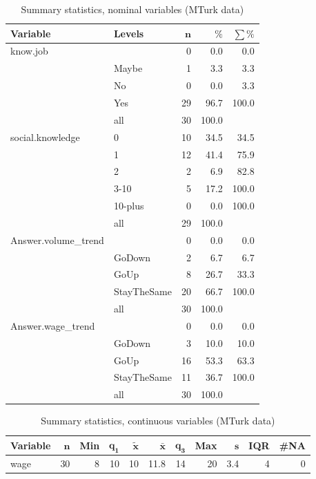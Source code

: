 \documentclass[a4paper,10pt]{article}\usepackage[]{graphicx}\usepackage[]{color}
\begin{document}
\begin{table}[ht]
\centering
{\footnotesize
\begin{tabular}{ll|rrr}
 \textbf{Variable} & \textbf{Levels} & $\mathbf{n}$ & $\mathbf{\%}$ & $\mathbf{\sum \%}$ \\ 
  \hline
know.job &  & 0 & 0.0 & 0.0 \\ 
   & Maybe & 1 & 3.3 & 3.3 \\ 
   & No & 0 & 0.0 & 3.3 \\ 
   & Yes & 29 & 96.7 & 100.0 \\ 
   \hline
 & all & 30 & 100.0 &  \\ 
   \hline
\hline
social.knowledge & 0 & 10 & 34.5 & 34.5 \\ 
   & 1 & 12 & 41.4 & 75.9 \\ 
   & 2 & 2 & 6.9 & 82.8 \\ 
   & 3-10 & 5 & 17.2 & 100.0 \\ 
   & 10-plus & 0 & 0.0 & 100.0 \\ 
   \hline
 & all & 29 & 100.0 &  \\ 
   \hline
\hline
Answer.volume\_trend &  & 0 & 0.0 & 0.0 \\ 
   & GoDown & 2 & 6.7 & 6.7 \\ 
   & GoUp & 8 & 26.7 & 33.3 \\ 
   & StayTheSame & 20 & 66.7 & 100.0 \\ 
   \hline
 & all & 30 & 100.0 &  \\ 
   \hline
\hline
Answer.wage\_trend &  & 0 & 0.0 & 0.0 \\ 
   & GoDown & 3 & 10.0 & 10.0 \\ 
   & GoUp & 16 & 53.3 & 63.3 \\ 
   & StayTheSame & 11 & 36.7 & 100.0 \\ 
   \hline
 & all & 30 & 100.0 &  \\ 
   \hline
\hline
\end{tabular}
}
\caption{Summary statistics, nominal variables (MTurk data)} 
\label{tab1:37-3010}
\end{table}
\begin{table}[ht]
\centering
{\footnotesize
\begin{tabular}{lrrrrrrrrrr}
 \textbf{Variable} & $\mathbf{n}$ & \textbf{Min} & $\mathbf{q_1}$ & $\mathbf{\widetilde{x}}$ & $\mathbf{\bar{x}}$ & $\mathbf{q_3}$ & \textbf{Max} & $\mathbf{s}$ & \textbf{IQR} & \textbf{\#NA} \\ 
  \hline
wage & 30 & 8 & 10 & 10 & 11.8 & 14 & 20 & 3.4 & 4 & 0 \\ 
  \end{tabular}
}
\caption{Summary statistics, continuous variables (MTurk data)} 
\label{tab2:37-3010}
\end{table}
\end{document}
